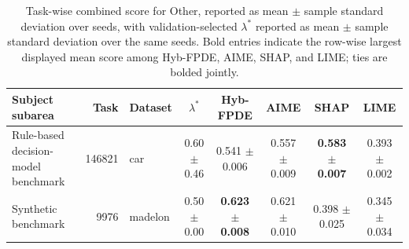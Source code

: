 \begin{table}[!tbp]
    \caption{Task-wise combined score for Other, reported as mean $\pm$ sample standard deviation over seeds, with validation-selected $\lambda^*$ reported as mean $\pm$ sample standard deviation over the same seeds. Bold entries indicate the row-wise largest displayed mean score among Hyb-FPDE, AIME, SHAP, and LIME; ties are bolded jointly.}
    \label{tab:taskwise_combined_scores_sd_other}
    \centering
    \scriptsize
    \setlength{\tabcolsep}{3pt}
    \renewcommand{\arraystretch}{1.03}
    \begin{tabular}{lrlccccc}
        \toprule
        Subject subarea & Task & Dataset & $\lambda^*$ & Hyb-FPDE & AIME & SHAP & LIME  \\
        \midrule
        Rule-based decision-model benchmark & 146821 & car & 0.60 $\pm$ 0.46 & 0.541 $\pm$ 0.006 & 0.557 $\pm$ 0.009 & \textbf{0.583 $\pm$ 0.007} & 0.393 $\pm$ 0.002 \\
        Synthetic benchmark & 9976 & madelon & 0.50 $\pm$ 0.00 & \textbf{0.623 $\pm$ 0.008} & 0.621 $\pm$ 0.010 & 0.398 $\pm$ 0.025 & 0.345 $\pm$ 0.034 \\
        \bottomrule
    \end{tabular}%
\end{table}
